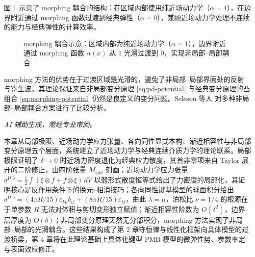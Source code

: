 图 \ref{fig:morphing} 示意了 morphing 耦合的结构：在区域内部使用纯近场动力学（$\alpha=1$），在边界附近通过 morphing 函数过渡到经典弹性（$\alpha=0$），兼顾近场动力学处理不连续的能力与经典弹性的计算效率。

\begin{figure}[htbp]
\centering
{}
\caption{morphing 耦合示意：区域内部为纯近场动力学（$\alpha=1$），边界附近通过 morphing 函数 $\alpha(x)$ 从 $1$ 光滑过渡到 $0$，实现非局部--局部耦合 \cite{Lubineau2012}}
\label{fig:morphing}
\end{figure}

morphing 方法的优势在于过渡区域是光滑的，避免了非局部--局部界面处的反射与寄生波。其理论保证来自非局部变分原理 \eqref{eq:pd-potential} 与经典变分原理的凸组合 \eqref{eq:morphing-potential} 仍然是良定义的变分问题。Seleson 等人 \cite{SelesonParks2011} 对多种非局部--局部耦合方案进行了比较分析。

\emph{AI 辅助生成，需经专业审阅。}

本章从局部极限、近场动力学应力张量、各向同性显式本构、渐近相容性与非局部变分原理五个层面，系统建立了近场动力学与经典连续介质力学的理论联系。局部极限证明了 $\delta\to 0$ 时近场力密度退化为经典应力散度，其首非零项来自 Taylor 展开的二阶修正，由四阶张量 $M_{ijkl}$ 刻画；近场动力学应力张量 $\sigma^{\mathrm{PD}}=\tfrac{1}{2}\int(\xi\otimes f+f\otimes\xi)\,dV$ 以弱形式散度恒等式给出了力密度的局部化，其证明核心是反作用条件下的换元--相消技巧；各向同性键基模型的球面积分给出 $\sigma^{\mathrm{PD}}=(4\pi R/15)\varepsilon_{kk}\delta_{ij}+(8\pi R/15)\varepsilon_{ij}$，由此 $\lambda=\mu$，泊松比 $\nu=1/4$ 的根源在于单参数 $R$ 无法对体积与剪切变形独立赋值；渐近相容性阶数为 $O(\delta^2)$，边界层厚度为 $O(\delta)$；非局部变分原理天然无分部积分，morphing 方法实现了非局部--局部的光滑耦合。这些结果构成了第 2 章守恒律与线性化框架向具体模型的过渡桥梁，第 4 章将在此理论基础上具体化键型 PMB 模型的微弹性势、参数率定与表面效应修正。
